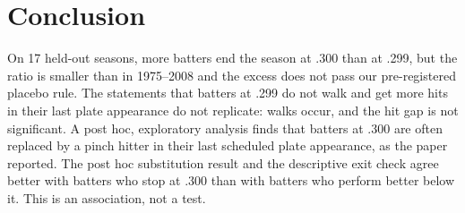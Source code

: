 \documentclass[11pt]{article}
\begin{document}
\section{Conclusion}

On 17 held-out seasons, more batters end the season at .300 than at .299, but the ratio is smaller than in 1975--2008 and the excess does not pass our pre-registered placebo rule. The statements that batters at .299 do not walk and get more hits in their last plate appearance do not replicate: walks occur, and the hit gap is not significant. A post hoc, exploratory analysis finds that batters at .300 are often replaced by a pinch hitter in their last scheduled plate appearance, as the paper reported. The post hoc substitution result and the descriptive exit check agree better with batters who stop at .300 than with batters who perform better below it. This is an association, not a test.
\end{document}

